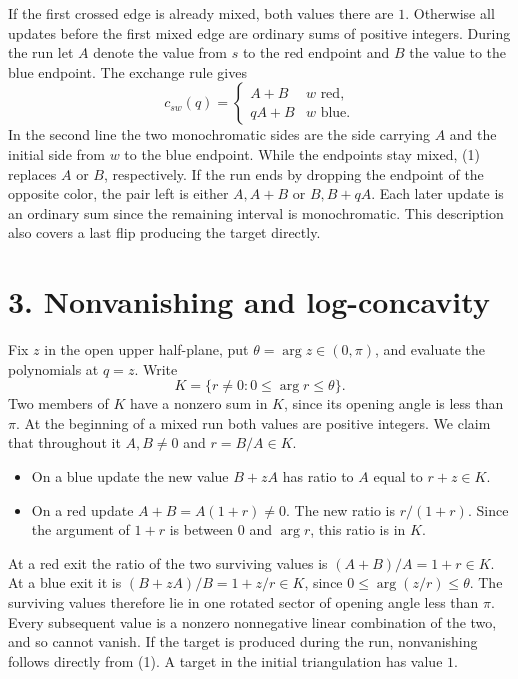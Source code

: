 \documentclass[11pt]{article}
\begin{document}
If the first crossed edge is already mixed, both values there are \(1\). Otherwise all updates before the first mixed edge are ordinary sums of positive integers. During the run let \(A\) denote the value from \(s\) to the red endpoint and \(B\) the value to the blue endpoint. The exchange rule gives
\[
           c_{sw}(q)=
           \begin{cases} A+B & w\text{ red},\\ qA+B & w\text{ blue}.\end{cases}                 \tag{1}
\]
In the second line the two monochromatic sides are the side carrying \(A\) and the initial side from \(w\) to the blue endpoint. While the endpoints stay mixed, (1) replaces \(A\) or \(B\), respectively. If the run ends by dropping the endpoint of the opposite color, the pair left is either \(A,A+B\) or \(B,B+qA\). Each later update is an ordinary sum since the remaining interval is monochromatic. This description also covers a last flip producing the target directly.

\section*{3. Nonvanishing and log-concavity}
Fix \(z\) in the open upper half-plane, put \(\theta=\arg z\in(0,\pi)\), and evaluate the polynomials at \(q=z\). Write
\[
                   K=\{r\ne0:0\le\arg r\le\theta\}.
\]
Two members of \(K\) have a nonzero sum in \(K\), since its opening angle is less than \(\pi\). At the beginning of a mixed run both values are positive integers. We claim that throughout it \(A,B\ne0\) and \(r=B/A\in K\).
\begin{itemize}
\item On a blue update the new value \(B+zA\) has ratio to \(A\) equal to \(r+z\in K\).
\item On a red update \(A+B=A(1+r)\ne0\). The new ratio is \(r/(1+r)\). Since the argument of \(1+r\) is between \(0\) and \(\arg r\), this ratio is in \(K\).
\end{itemize}
At a red exit the ratio of the two surviving values is \((A+B)/A=1+r\in K\). At a blue exit it is \((B+zA)/B=1+z/r\in K\), since \(0\le\arg(z/r)\le\theta\). The surviving values therefore lie in one rotated sector of opening angle less than \(\pi\). Every subsequent value is a nonzero nonnegative linear combination of the two, and so cannot vanish. If the target is produced during the run, nonvanishing follows directly from (1). A target in the initial triangulation has value \(1\).
\end{document}

